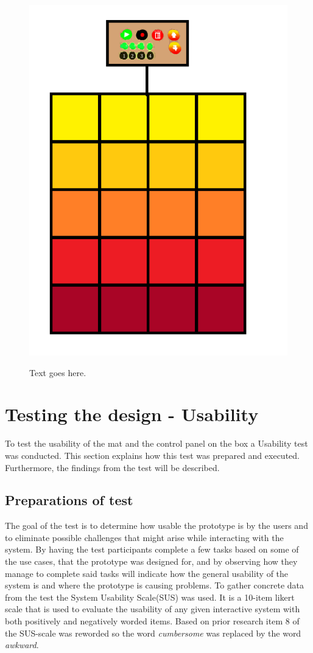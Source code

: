 \begin{figure}[H]
	\centering
	\includegraphics[width=0.7\linewidth]{figure/Design/DesignFinal}
	\label{fig:designFinal}
	\caption{Text goes here.}	
\end{figure}













\section{Testing the design - Usability}
To test the usability of the mat and the control panel on the box a Usability test was conducted. This section explains how this test was prepared and executed. Furthermore, the findings from the test will be described.

\subsection{Preparations of test}
The goal of the test is to determine how usable the prototype is by the users and to eliminate possible challenges that might arise while interacting with the system. By having the test participants complete a few tasks based on some of the use cases, that the prototype was designed for, and by observing how they manage to complete said tasks will indicate how the general usability of the system is and where the prototype is causing problems. To gather concrete data from the test the System Usability Scale(SUS)\cite{susScale} was used. It is a 10-item likert scale that is used to evaluate the usability of any given interactive system with both positively and negatively worded items. Based on prior research item 8 of the SUS-scale was reworded so the word \textit{cumbersome} was replaced by the word \textit{awkward}\cite{susScale}.


